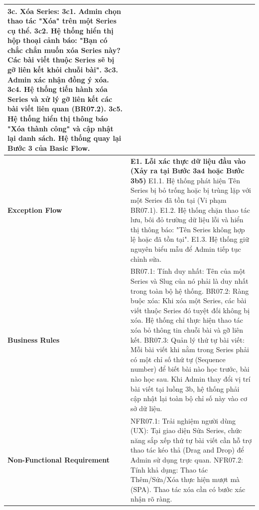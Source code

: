 \documentclass[a4paper,12pt]{article}
\begin{document}
\begin{longtable}{|p{4cm}|p{11.5cm}|}
3c. Xóa Series: \newline
3c1. Admin chọn thao tác "Xóa" trên một Series cụ thể. \newline
3c2. Hệ thống hiển thị hộp thoại cảnh báo: "Bạn có chắc chắn muốn xóa Series này? Các bài viết thuộc Series sẽ bị gỡ liên kết khỏi chuỗi bài". \newline
3c3. Admin xác nhận đồng ý xóa. \newline
3c4. Hệ thống tiến hành xóa Series và xử lý gỡ liên kết các bài viết liên quan (BR07.2). \newline
3c5. Hệ thống hiển thị thông báo "Xóa thành công" và cập nhật lại danh sách. \newline
Hệ thống quay lại Bước 3 của Basic Flow. \\ \hline
\textbf{Exception Flow} & 
\textbf{E1. Lỗi xác thực dữ liệu đầu vào (Xảy ra tại Bước 3a4 hoặc Bước 3b5)} \newline
E1.1. Hệ thống phát hiện Tên Series bị bỏ trống hoặc bị trùng lặp với một Series đã tồn tại (Vi phạm BR07.1). \newline
E1.2. Hệ thống chặn thao tác lưu, bôi đỏ trường dữ liệu lỗi và hiển thị thông báo: "Tên Series không hợp lệ hoặc đã tồn tại". \newline
E1.3. Hệ thống giữ nguyên biểu mẫu để Admin tiếp tục chỉnh sửa. \\ \hline
\textbf{Business Rules} & 
BR07.1: Tính duy nhất: Tên của một Series và Slug của nó phải là duy nhất trong toàn bộ hệ thống. \newline
BR07.2: Ràng buộc xóa: Khi xóa một Series, các bài viết thuộc Series đó tuyệt đối không bị xóa. Hệ thống chỉ thực hiện thao tác xóa bỏ thông tin chuỗi bài và gỡ liên kết. \newline
BR07.3: Quản lý thứ tự bài viết: Mỗi bài viết khi nằm trong Series phải có một chỉ số thứ tự (Sequence number) để biết bài nào học trước, bài nào học sau. Khi Admin thay đổi vị trí bài viết tại luồng 3b, hệ thống phải cập nhật lại toàn bộ chỉ số này vào cơ sở dữ liệu. \\ \hline
\textbf{Non-Functional Requirement} & 
NFR07.1: Trải nghiệm người dùng (UX): Tại giao diện Sửa Series, chức năng sắp xếp thứ tự bài viết cần hỗ trợ thao tác kéo thả (Drag and Drop) để Admin sử dụng trực quan. \newline
NFR07.2: Tính khả dụng: Thao tác Thêm/Sửa/Xóa thực hiện mượt mà (SPA). Thao tác xóa cần có bước xác nhận rõ ràng. \\ \hline
\end{longtable}
\end{document}

